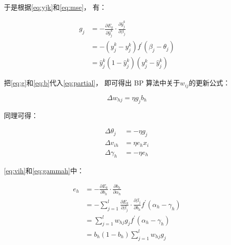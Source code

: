 于是根据\cref{eq:yjk}和\cref{eq:mse}，
有：

\begin{equation}
    \label{eq:g}
    \begin{aligned}
        g _ { j } & = - \frac { \partial E _ { k } } { \partial \hat { y } _ { j } ^ { k } } \cdot \frac { \partial \hat { y } _ { j } ^ { k } } { \partial \beta _ { j } } \\
                  & = - ( \hat { y } _ { j } ^ { k } - y _ { j } ^ { k } ) f ^ { \prime } ( \beta _ { j } - \theta _ { j } )                                                \\
                  & = \hat { y } _ { j } ^ { k } ( 1 - \hat { y } _ { j } ^ { k } ) ( y _ { j } ^ { k } - \hat { y } _ { j } ^ { k } )
    \end{aligned}
\end{equation}

把\cref{eq:g}和\cref{eq:b}代入\cref{eq:partial}，
即可得出 BP 算法中关于$w_{ij}$的更新公式：

\begin{equation}
    \label{eq:whj}
    \Delta w_{hj} = \eta g_jb_h
\end{equation}

同理可得：

\begin{align}
    \Delta\theta_j                   & = -\eta g_j   \\
    \label{eq:vih}\Delta v_{ih}      & = \eta e_hx_i \\
    \label{eq:gammah}\Delta \gamma_h & = -\eta e_h
\end{align}

\cref{eq:vih}和\cref{eq:gammah}中：

\begin{equation}
    \label{eq:e}
    \begin{aligned}
        e _ { h } & = - \frac { \partial E _ { k } } { \partial b _ { h } } \cdot \frac { \partial b _ { h } } { \partial \alpha _ { h } }                                                                                \\
                  & = - \sum _ { j = 1 } ^ { l } \frac { \partial E _ { k } } { \partial \beta _ { j } } \cdot \frac { \partial \beta _ { j } } { \partial b _ { h } } f ^ { \prime } ( \alpha _ { h } - \gamma _ { h } ) \\
                  & = \sum _ { j = 1 } ^ { l } w _ { h j } g _ { j } f ^ { \prime } ( \alpha _ { h } - \gamma _ { h } )                                                                                                   \\
                  & = b _ { h } ( 1 - b _ { h } ) \sum _ { j = 1 } ^ { l } w _ { h j } g _ { j }
    \end{aligned}
\end{equation}

